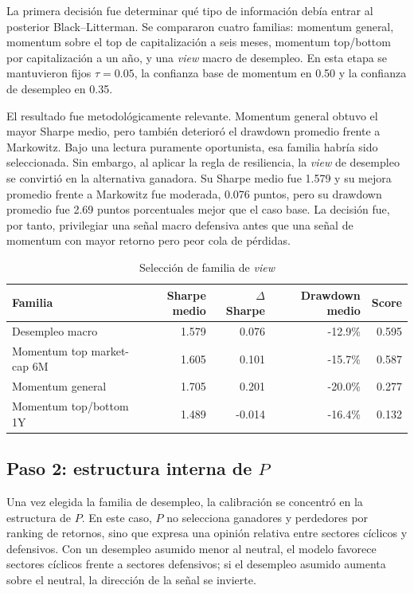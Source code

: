 \documentclass[11pt]{article}
\begin{document}
La primera decisi\'on fue determinar qu\'e tipo de informaci\'on deb\'ia entrar al posterior Black--Litterman. Se compararon cuatro familias: momentum general, momentum sobre el top de capitalizaci\'on a seis meses, momentum top/bottom por capitalizaci\'on a un a\~no, y una \textit{view} macro de desempleo. En esta etapa se mantuvieron fijos $\tau = 0.05$, la confianza base de momentum en 0.50 y la confianza de desempleo en 0.35.

El resultado fue metodol\'ogicamente relevante. Momentum general obtuvo el mayor Sharpe medio, pero tambi\'en deterior\'o el drawdown promedio frente a Markowitz. Bajo una lectura puramente oportunista, esa familia habr\'ia sido seleccionada. Sin embargo, al aplicar la regla de resiliencia, la \textit{view} de desempleo se convirti\'o en la alternativa ganadora. Su Sharpe medio fue 1.579 y su mejora promedio frente a Markowitz fue moderada, 0.076 puntos, pero su drawdown promedio fue 2.69 puntos porcentuales mejor que el caso base. La decisi\'on fue, por tanto, privilegiar una se\~nal macro defensiva antes que una se\~nal de momentum con mayor retorno pero peor cola de p\'erdidas.

\begin{table}[H]
\centering
\caption{Selecci\'on de familia de \textit{view}}
\label{tab:familia_view}
\begin{tabular}{l r r r r}
\toprule
Familia & Sharpe medio & $\Delta$ Sharpe & Drawdown medio & Score \\
\midrule
Desempleo macro & 1.579 & 0.076 & -12.9\% & 0.595 \\
Momentum top market-cap 6M & 1.605 & 0.101 & -15.7\% & 0.587 \\
Momentum general & 1.705 & 0.201 & -20.0\% & 0.277 \\
Momentum top/bottom 1Y & 1.489 & -0.014 & -16.4\% & 0.132 \\
\bottomrule
\end{tabular}
\end{table}

\subsection{Paso 2: estructura interna de $P$}

Una vez elegida la familia de desempleo, la calibraci\'on se concentr\'o en la estructura de $P$. En este caso, $P$ no selecciona ganadores y perdedores por ranking de retornos, sino que expresa una opini\'on relativa entre sectores c\'iclicos y defensivos. Con un desempleo asumido menor al neutral, el modelo favorece sectores c\'iclicos frente a sectores defensivos; si el desempleo asumido aumenta sobre el neutral, la direcci\'on de la se\~nal se invierte.
\end{document}
